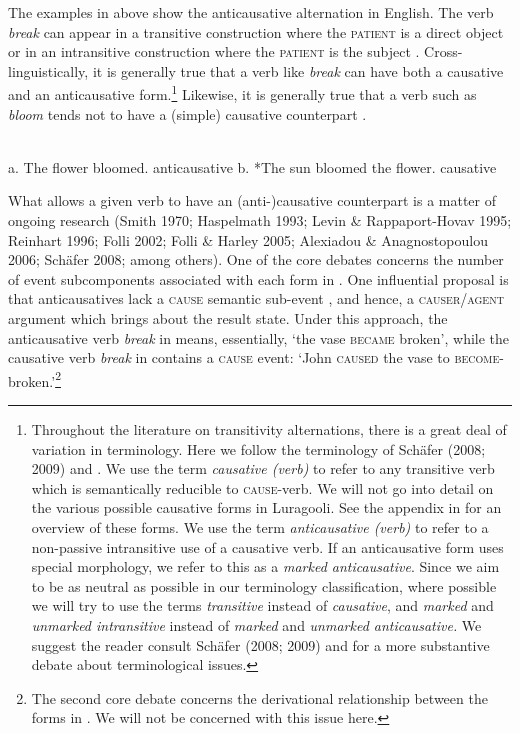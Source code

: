 \documentclass[output=paper]{langsci/langscibook}
\begin{document}
The examples in  above show the anticausative alternation in English. The verb \textit{break} can appear in a transitive construction where the \textsc{patient} is a direct object  or in an intransitive construction where the \textsc{patient} is the subject . Cross-linguistically, it is generally true that a verb like \textit{break} can have both a causative and an anticausative form.\footnote{ Throughout the literature on transitivity alternations, there is a great deal of variation in terminology. Here we follow the terminology of Schäfer (2008; 2009) and \citet{AlexiadouEtAl2015}. We use the term \textit{causative (verb)} to refer to any transitive verb which is semantically reducible to \textsc{cause}-verb. We will not go into detail on the various possible causative forms in Luragooli. See the appendix in \citet{GluckmanBowler2015} for an overview of these forms. We use the term \textit{anticausative (verb)} to refer to a non-passive intransitive use of a causative verb. If an anticausative form uses special morphology, we refer to this as a \textit{marked anticausative}. Since we aim to be as neutral as possible in our terminology classification, where possible we will try to use the terms \textit{transitive} instead of \textit{causative}, and \textit{marked} and \textit{unmarked intransitive }instead of \textit{marked }and \textit{unmarked anticausative. }We suggest the reader consult Schäfer (2008; 2009) and \citet{AlexiadouEtAl2015} for a more substantive debate about terminological issues.} Likewise, it is generally true that a verb such as \textit{bloom}  tends not to have a (simple) causative counterpart .

\ea\label{exx:}
\ea
{}\\
 a.  The flower bloomed.        anticausative
\ex
 b.  *The sun bloomed the flower.      causative
 \z
 \z
 
What allows a given verb to have an (anti-)causative counterpart is a matter of ongoing research (Smith 1970; Haspelmath 1993; Levin \& Rappaport-Hovav 1995; Reinhart 1996; Folli 2002; Folli \& Harley 2005; Alexiadou \& Anagnostopoulou 2006; Schäfer 2008; among others). One of the core debates concerns the number of event subcomponents associated with each form in . One influential proposal is that anticausatives lack a \textsc{cause} semantic sub-event \citep{Haspelmath1993}, and hence, a \textsc{causer/agent} argument which brings about the result state. Under this approach, the anticausative verb \textit{break} in  means, essentially, ‘the vase \textsc{became} broken’, while the causative verb \textit{break} in  contains a \textsc{cause} event: ‘John \textsc{caused} the vase to \textsc{become}-broken.’\footnote{The second core debate concerns the derivational relationship between the forms in . We will not be concerned with this issue here.}
\end{document}
